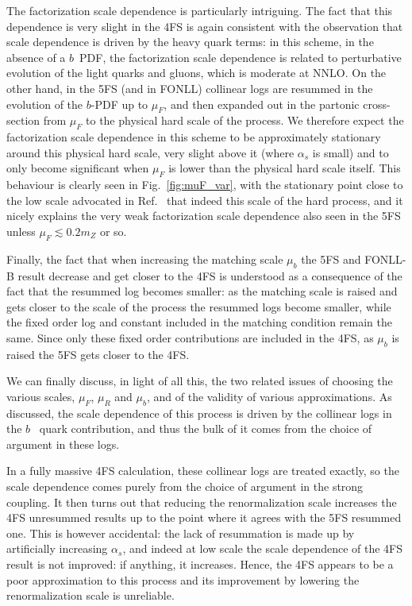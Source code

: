 \documentclass[12pt]{article}
\begin{document}
The factorization scale dependence is particularly intriguing. The
fact that this dependence is very slight in the 4FS is again consistent
with the observation that scale dependence is driven by the heavy
quark terms: in this scheme, in the absence of a $b$~PDF, the factorization scale
dependence is  related to perturbative evolution of the light
quarks and gluons, which is moderate at NNLO. 
On the other hand, in the 5FS (and in FONLL) collinear logs are
resummed in the evolution  of the $b$-PDF up to $\mu_F$, and then
expanded out in the partonic cross-section from $\mu_F$ to the
physical hard scale of the process. We therefore expect the
factorization scale dependence in this scheme to be approximately
stationary around this physical hard scale, very slight above it (where
$\alpha_s$ is small) and to only become significant when $\mu_F$ is
lower than the physical hard scale itself. This behaviour is
clearly seen in Fig.~\ref{fig:muF_var}, with the stationary point
close to the low scale advocated in Ref.~\cite{Maltoni:2012pa,Lim:2016wjo} 
that indeed this scale of the hard process, and it nicely explains the
very weak factorization scale dependence also seen in the 5FS unless
$\mu_F\lesssim0.2m_Z$ or so.

Finally, the fact that when increasing the matching scale $\mu_b$ the
5FS and FONLL-B result decrease and get closer to the 4FS is
understood as a consequence of the fact that the resummed log becomes
smaller: as the matching scale is raised and gets closer to
the scale of the process the resummed logs become smaller, while the
fixed order log and constant included in the matching condition remain
the same. Since only these 
fixed order contributions are  included in the 4FS, as $\mu_b$ is
raised the 5FS gets closer to the 4FS.

We can finally discuss, in light of all this, the two related issues
of choosing the various scales, $\mu_F$, $\mu_R$ and $\mu_b$, and of
the validity of various approximations. As discussed, the scale
dependence of this process is driven by the collinear logs in the
$b$~ quark contribution, and thus the bulk of it comes from the
choice of argument in these logs. 

In a fully massive 4FS calculation,
these collinear logs are treated exactly, so the scale dependence
comes purely from the choice of argument in the strong coupling. It
then turns out that reducing the renormalization scale increases the
4FS unresummed results up to the point where it agrees with the 5FS
resummed one. This is however accidental: the lack of resummation is made up
by artificially increasing $\alpha_s$, and indeed at low scale the
scale dependence of the 4FS result is not improved: if anything, it
increases. Hence, the 4FS appears to be a poor approximation to this
process and its improvement by lowering the renormalization scale  is
unreliable.
\end{document}
